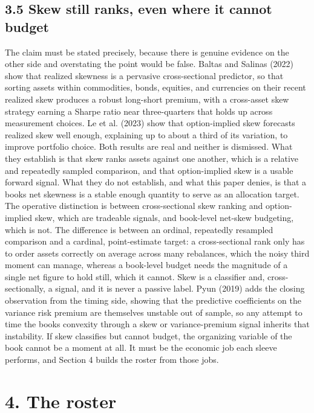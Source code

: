 \documentclass[12pt, a4paper]{article}
\begin{document}
\subsection*{3.5 Skew still ranks, even where it cannot
budget}\label{skew-still-ranks-even-where-it-cannot-budget}

The claim must be stated precisely, because there is genuine evidence on
the other side and overstating the point would be false. Baltas and
Salinas (2022) show that realized skewness is a pervasive
cross-sectional predictor, so that sorting assets within commodities,
bonds, equities, and currencies on their recent realized skew produces a
robust long-short premium, with a cross-asset skew strategy earning a
Sharpe ratio near three-quarters that holds up across measurement
choices. Le et al. (2023) show that option-implied skew forecasts
realized skew well enough, explaining up to about a third of its
variation, to improve portfolio choice. Both results are real and
neither is dismissed. What they establish is that skew ranks assets
against one another, which is a relative and repeatedly sampled
comparison, and that option-implied skew is a usable forward signal.
What they do not establish, and what this paper denies, is that a
book\textquotesingle s net skewness is a stable enough quantity to serve
as an allocation target. The operative distinction is between
cross-sectional skew ranking and option-implied skew, which are
tradeable signals, and book-level net-skew budgeting, which is not. The
difference is between an ordinal, repeatedly resampled comparison and a
cardinal, point-estimate target: a cross-sectional rank only has to
order assets correctly on average across many rebalances, which the
noisy third moment can manage, whereas a book-level budget needs the
magnitude of a single net figure to hold still, which it cannot. Skew is
a classifier and, cross-sectionally, a signal, and it is never a passive
label. Pyun (2019) adds the closing observation from the timing side,
showing that the predictive coefficients on the variance risk premium
are themselves unstable out of sample, so any attempt to time the
book\textquotesingle s convexity through a skew or variance-premium
signal inherits that instability. If skew classifies but cannot budget,
the organizing variable of the book cannot be a moment at all. It must
be the economic job each sleeve performs, and Section 4 builds the
roster from those jobs.

\section*{4. The roster}\label{the-roster}
\end{document}

